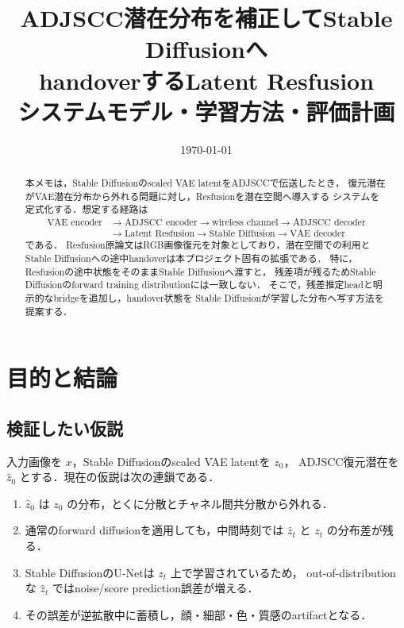 \documentclass[11pt,a4paper]{ltjsarticle}
\title{ADJSCC潜在分布を補正してStable Diffusionへ\\
handoverするLatent Resfusion\\
\large システムモデル・学習方法・評価計画}
\author{}
\date{\today}
\begin{document}
\maketitle

\begin{abstract}
本メモは，Stable Diffusionのscaled VAE latentをADJSCCで伝送したとき，
復元潜在がVAE潜在分布から外れる問題に対し，Resfusionを潜在空間へ導入する
システムを定式化する．想定する経路は
\[
\begin{aligned}
  \text{VAE encoder}
  &\to \text{ADJSCC encoder}
  \to \text{wireless channel}
  \to \text{ADJSCC decoder} \\
  &\to \text{Latent Resfusion}
  \to \text{Stable Diffusion}
  \to \text{VAE decoder}
\end{aligned}
\]
である．
Resfusion原論文\cite{resfusion}はRGB画像復元を対象としており，潜在空間での利用と
Stable Diffusionへの途中handoverは本プロジェクト固有の拡張である．
特に，Resfusionの途中状態をそのままStable Diffusionへ渡すと，
残差項が残るためStable Diffusionのforward training distributionには一致しない．
そこで，残差推定headと明示的なbridgeを追加し，handover状態を
Stable Diffusionが学習した分布へ写す方法を提案する．
\end{abstract}

\tableofcontents
\clearpage

\section{目的と結論}

\subsection{検証したい仮説}

入力画像を \(x\)，Stable Diffusionのscaled VAE latentを \(z_0\)，
ADJSCC復元潜在を \(\hat z_0\) とする．現在の仮説は次の連鎖である．
\begin{enumerate}
  \item \(\hat z_0\) は \(z_0\) の分布，とくに分散とチャネル間共分散から外れる．
  \item 通常のforward diffusionを適用しても，中間時刻では
        \(\hat z_t\) と \(z_t\) の分布差が残る．
  \item Stable DiffusionのU-Netは \(z_t\) 上で学習されているため，
        out-of-distributionな \(\hat z_t\) ではnoise/score prediction誤差が増える．
  \item その誤差が逆拡散中に蓄積し，顔・細部・色・質感のartifactとなる．
\end{enumerate}
\end{document}
